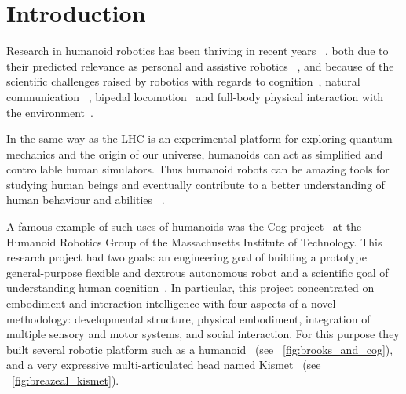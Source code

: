 


\chapter{Introduction} %


Research in humanoid robotics has been thriving in recent years~\parencite{hirai1998development} \parencite{kaneko2008humanoid}, both due to their predicted relevance as personal and assistive robotics~\parencite{tapus2007socially} \parencite{oztop2005human}, and because of the scientific challenges raised by robotics with regards to cognition~\parencite{asada2001cognitive}, natural communication~\parencite{stiefelhagen2004natural} \parencite{breazeal2002robots}, bipedal locomotion~\parencite{yamaguchi1999development} \parencite{chestnutt2005footstep} \parencite{collins2005bipedal} and full-body physical interaction with the environment~\parencite{ude2004programming}.

In the same way as the LHC is an experimental platform for exploring quantum mechanics and the origin of our universe, humanoids can act as simplified and controllable human simulators. Thus humanoid robots can be amazing tools for studying human beings and eventually contribute to a better understanding of human behaviour and abilities~\parencite{atkeson2000using} \parencite{cheng2007cb} \parencite{brooks1986achieving}.

A famous example of such uses of humanoids was the Cog project~\parencite{brooks1999cog} at the Humanoid Robotics Group of the Massachusetts Institute of Technology. This research project had two goals: an engineering goal of building a prototype general-purpose flexible and dextrous autonomous robot and a scientific goal of understanding human cognition~\parencite{brooks1994building}. In particular, this project concentrated on embodiment and interaction intelligence with four aspects of a novel methodology: developmental structure, physical embodiment, integration of multiple sensory and motor systems, and social interaction. For this purpose they built several robotic platform such as a humanoid~\parencite{brooks1999cog} (see \figurename~\ref{fig:brooks_and_cog}), and a very expressive multi-articulated head named Kismet~\parencite{breazeal2003emotion} (see \figurename~\ref{fig:breazeal_kismet}).



